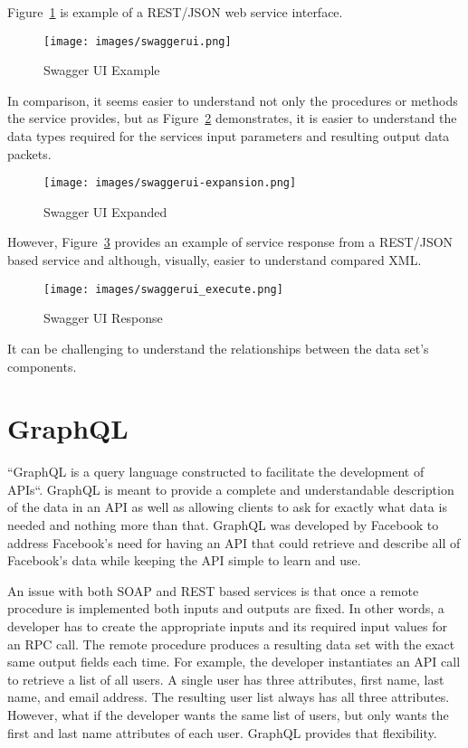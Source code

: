 Figure~\ref{f:swaggerui-example}\cite{hid505swaggerio2018} is example of a REST/JSON web service
interface.  
\begin{figure}[!ht]
  \centering\texttt{[image: images/swaggerui.png]}
  \caption{Swagger UI Example}\label{f:swaggerui-example}
\end{figure}
In comparison, it seems easier to understand not only the procedures
or methods the service provides, but as Figure~\ref{f:swaggerui-expansion}\cite{hid505swaggerio2018}
demonstrates, it is easier to understand the data types required for the services input
parameters and resulting output data packets.  
\begin{figure}[!ht]
  \centering\texttt{[image: images/swaggerui-expansion.png]}
  \caption{Swagger UI Expanded}\label{f:swaggerui-expansion}
\end{figure}
However, Figure~\ref{f:swagger-resp}\cite{hid505swaggerresp2018} provides an example 
of service response from a REST/JSON based service and although, visually, 
easier to understand compared XML.  
\begin{figure}[!ht]
  \centering\texttt{[image: images/swaggerui\_execute.png]}
  \caption{Swagger UI Response}\label{f:swagger-resp}
\end{figure}
It can be challenging to understand the relationships between the data set's 
components.

\section{GraphQL}
``GraphQL is a query language constructed to facilitate the development of APIs``\cite{hid505FacebookGraphQL2018}.
GraphQL is meant to provide a complete and understandable description of the
data in an API as well as allowing clients to ask for exactly what data is 
needed and nothing more than that\cite{hid505FacebookGraphQL2018}.  GraphQL was 
developed by Facebook to address Facebook's need for having an API that could 
retrieve and describe all of Facebook's data while keeping the API simple to 
learn and use\cite{hid505Byron2015}.

An issue with both SOAP and REST based services is that once a remote
procedure is implemented both inputs and outputs are fixed.  In other words,
a developer has to create the appropriate inputs and its required input values
for an RPC call.  The remote procedure produces a resulting data set with the
exact same output fields each time.  For example, the developer instantiates an
API call to retrieve a list of all users.  A single user has three attributes,
first name, last name, and email address.  The resulting user list always has
all three attributes.  However, what if the developer wants the same list of
users, but only wants the first and last name attributes of each user.  GraphQL
provides that flexibility.

